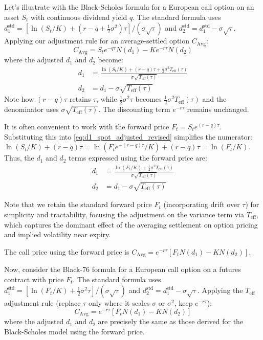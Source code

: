 \documentclass[11pt]{article}
\theoremstyle{plain}
\begin{document}
Let's illustrate with the Black-Scholes formula for a European call option on an asset $S_t$ with continuous dividend yield $q$. The standard formula uses $d_1^{\mathrm{std}} = [\ln(S_t/K) + (r - q + \frac{1}{2}\sigma^2)\tau] / (\sigma \sqrt{\tau})$ and $d_2^{\mathrm{std}} = d_1^{\mathrm{std}} - \sigma \sqrt{\tau}$. Applying our adjustment rule for an average-settled option $C_{\mathrm{Avg}}$:
\begin{equation}
  C_{\mathrm{Avg}} = S_t e^{-q\tau} N(d_1) - K e^{-r\tau} N(d_2)
\end{equation}
where the adjusted $d_1$ and $d_2$ become:
\begin{align}
  d_1 &= \frac{\ln(S_t/K) + (r - q)\tau + \frac{1}{2}\sigma^2 T_{\mathrm{eff}}(\tau)}{\sigma \sqrt{T_{\mathrm{eff}}(\tau)}} \label{eq:d1_spot_adjusted_revised} \\
  d_2 &= d_1 - \sigma \sqrt{T_{\mathrm{eff}}(\tau)} \label{eq:d2_spot_adjusted_revised}
\end{align}
Note how $(r-q)\tau$ retains $\tau$, while $\frac{1}{2}\sigma^2\tau$ becomes $\frac{1}{2}\sigma^2 T_{\mathrm{eff}}(\tau)$ and the denominator uses $\sigma \sqrt{T_{\mathrm{eff}}(\tau)}$. The discounting term $e^{-r\tau}$ remains unchanged.

It is often convenient to work with the forward price $F_t = S_t e^{(r-q)\tau}$. Substituting this into \cref{eq:d1_spot_adjusted_revised} simplifies the numerator: $\ln(S_t/K) + (r - q)\tau = \ln(F_t e^{-(r-q)\tau}/K) + (r - q)\tau = \ln(F_t/K)$. Thus, the $d_1$ and $d_2$ terms expressed using the forward price are:
\begin{align}
  d_1 &= \frac{\ln(F_t/K) + \frac{1}{2}\sigma^2 T_{\mathrm{eff}}(\tau)}{\sigma \sqrt{T_{\mathrm{eff}}(\tau)}} \label{eq:d1_fwd_adjusted_revised} \\
  d_2 &= d_1 - \sigma \sqrt{T_{\mathrm{eff}}(\tau)} \label{eq:d2_fwd_adjusted_revised}
\end{align}

Note that we retain the standard forward price $F_t$ (incorporating drift over $\tau$) for simplicity and tractability, focusing the adjustment on the variance term via $T_{\mathrm{eff}}$, which captures the dominant effect of the averaging settlement on option pricing and implied volatility near expiry.

The call price using the forward price is $C_{\mathrm{Avg}} = e^{-r\tau} [ F_t N(d_1) - K N(d_2) ]$.

Now, consider the Black-76 formula for a European call option on a futures contract with price $F_t$. The standard formula uses $d_1^{\mathrm{std}} = [\ln(F_t/K) + \frac{1}{2}\sigma^2 \tau] / (\sigma \sqrt{\tau})$ and $d_2^{\mathrm{std}} = d_1^{\mathrm{std}} - \sigma \sqrt{\tau}$. Applying the $T_{\mathrm{eff}}$ adjustment rule (replace $\tau$ only where it scales $\sigma$ or $\sigma^2$, keep $e^{-r\tau}$):
\begin{equation}
  C_{\mathrm{Avg}} = e^{-r\tau} \left[ F_t N(d_1) - K N(d_2) \right]
\end{equation}
where the adjusted $d_1$ and $d_2$ are precisely the same as those derived for the Black-Scholes model using the forward price.
\end{document}
